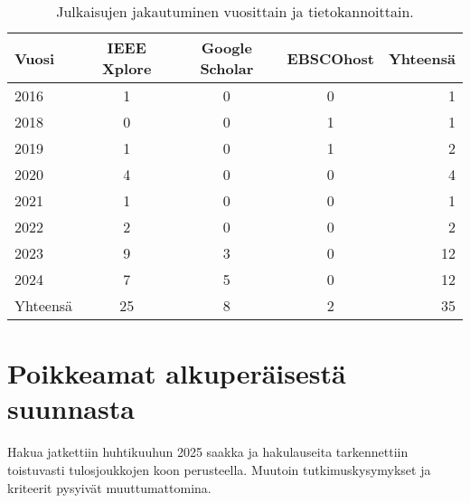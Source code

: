 \documentclass[bscthesis,finnish,oneside,biblatex]{uefcsthesis}
\begin{document}
    \begin{table}[htbp]
        \centering
        \footnotesize
        \caption{Julkaisujen jakautuminen vuosittain ja tietokannoittain.}
        \label{tab:descriptive}
        \begin{tabular}{lcccr}
            \toprule
            \textbf{Vuosi} & \textbf{IEEE Xplore} & \textbf{Google Scholar} & \textbf{EBSCOhost} & \textbf{Yhteensä} \\
            \midrule
            2016           & 1                    & 0                       & 0                  & 1                 \\
            2018           & 0                    & 0                       & 1                  & 1                 \\
            2019           & 1                    & 0                       & 1                  & 2                 \\
            2020           & 4                    & 0                       & 0                  & 4                 \\
            2021           & 1                    & 0                       & 0                  & 1                 \\
            2022           & 2                    & 0                       & 0                  & 2                 \\
            2023           & 9                    & 3                       & 0                  & 12                \\
            2024           & 7                    & 5                       & 0                  & 12                \\
            \midrule
            Yhteensä       & 25                   & 8                       & 2                  & 35                \\
            \bottomrule
        \end{tabular}
    \end{table}



    \section{Poikkeamat alkuperäisestä suunnasta}
    \label{sec:deviations}

    Hakua jatkettiin huhtikuuhun 2025 saakka ja hakulauseita tarkennettiin toistuvasti tulosjoukkojen koon perusteella. Muutoin tutkimuskysymykset ja kriteerit pysyivät muuttumattomina.
\end{document}
